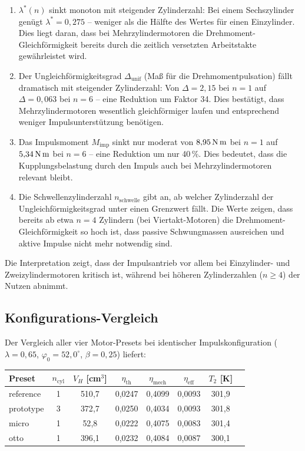 ﻿\documentclass[a4paper,12pt]{article}
\begin{document}
\begin{enumerate}
  \item $\lambda^*(n)$ sinkt monoton mit steigender Zylinderzahl: Bei einem
    Sechszylinder genügt $\lambda^* = 0{,}275$ -- weniger als die Hälfte
    des Wertes für einen Einzylinder. Dies liegt daran, dass bei Mehrzylindermotoren
    die Drehmoment-Gleichförmigkeit bereits durch die zeitlich versetzten
    Arbeitstakte gewährleistet wird.

  \item Der Ungleichförmigkeitsgrad $\Delta_\text{unif}$ (Maß für die
    Drehmomentpulsation) fällt dramatisch mit steigender Zylinderzahl:
    Von $\Delta = 2{,}15$ bei $n=1$ auf $\Delta = 0{,}063$ bei $n=6$ --
    eine Reduktion um Faktor 34. Dies bestätigt, dass Mehrzylindermotoren
    wesentlich gleichförmiger laufen und entsprechend weniger Impulsunterstützung
    benötigen.

  \item Das Impulsmoment $M_\text{imp}$ sinkt nur moderat von $8{,}95\,\text{N\,m}$
    bei $n=1$ auf $5{,}34\,\text{N\,m}$ bei $n=6$ -- eine Reduktion um
    nur 40\,\%. Dies bedeutet, dass die Kupplungsbelastung durch den Impuls
    auch bei Mehrzylindermotoren relevant bleibt.

  \item Die Schwellenzylinderzahl $n_\text{schwelle}$ gibt an, ab welcher
    Zylinderzahl der Ungleichförmigkeitsgrad unter einen Grenzwert fällt.
    Die Werte zeigen, dass bereits ab etwa $n = 4$ Zylindern (bei Viertakt-Motoren)
    die Drehmoment-Gleichförmigkeit so hoch ist, dass passive Schwungmassen
    ausreichen und aktive Impulse nicht mehr notwendig sind.
\end{enumerate}

Die Interpretation zeigt, dass der Impulsantrieb vor allem bei Einzylinder-
und Zweizylindermotoren kritisch ist, während bei höheren Zylinderzahlen
($n \geq 4$) der Nutzen abnimmt.

\subsection{Konfigurations-Vergleich}

Der Vergleich aller vier Motor-Presets bei identischer Impulskonfiguration
($\lambda = 0{,}65$, $\varphi_0 = 52{,}0^\circ$, $\beta = 0{,}25$) liefert:

\begin{center}
\begin{tabular}{lccccccc}
\toprule
Preset & $n_\text{cyl}$ & $V_H$ [cm$^3$] & $\eta_\text{th}$ & $\eta_\text{mech}$ & $\eta_\text{eff}$ & $T_2$ [K] \\
\midrule
reference & 1 & 510{,}7 & 0{,}0247 & 0{,}4099 & 0{,}0093 & 301{,}9 \\
prototype & 3 & 372{,}7 & 0{,}0250 & 0{,}4034 & 0{,}0093 & 301{,}8 \\
micro & 1 & 52{,}8 & 0{,}0222 & 0{,}4075 & 0{,}0083 & 301{,}4 \\
otto & 1 & 396{,}1 & 0{,}0232 & 0{,}4084 & 0{,}0087 & 300{,}1 \\
\bottomrule
\end{tabular}
\end{center}
\end{document}
